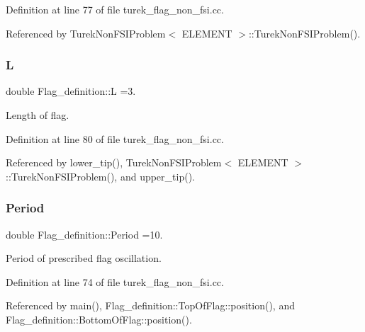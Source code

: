 Definition at line 77 of file turek\+\_\+flag\+\_\+non\+\_\+fsi.\+cc.



Referenced by Turek\+Non\+F\+S\+I\+Problem$<$ E\+L\+E\+M\+E\+N\+T $>$\+::\+Turek\+Non\+F\+S\+I\+Problem().

\mbox{\label{namespaceFlag__definition_a94553533bee82260731a466182369a9d}} 
\subsubsection{\texorpdfstring{L}{L}}
{\footnotesize\ttfamily double Flag\+\_\+definition\+::L =3.}



Length of flag. 



Definition at line 80 of file turek\+\_\+flag\+\_\+non\+\_\+fsi.\+cc.



Referenced by lower\+\_\+tip(), Turek\+Non\+F\+S\+I\+Problem$<$ E\+L\+E\+M\+E\+N\+T $>$\+::\+Turek\+Non\+F\+S\+I\+Problem(), and upper\+\_\+tip().

\mbox{\label{namespaceFlag__definition_a47976a19abd58b9c31671f074ca57285}} 
\subsubsection{\texorpdfstring{Period}{Period}}
{\footnotesize\ttfamily double Flag\+\_\+definition\+::\+Period =10.}



Period of prescribed flag oscillation. 



Definition at line 74 of file turek\+\_\+flag\+\_\+non\+\_\+fsi.\+cc.



Referenced by main(), Flag\+\_\+definition\+::\+Top\+Of\+Flag\+::position(), and Flag\+\_\+definition\+::\+Bottom\+Of\+Flag\+::position().

\mbox{\label{namespaceFlag__definition_a921d8bd82b7b267651dea625a548dfcb}} 
